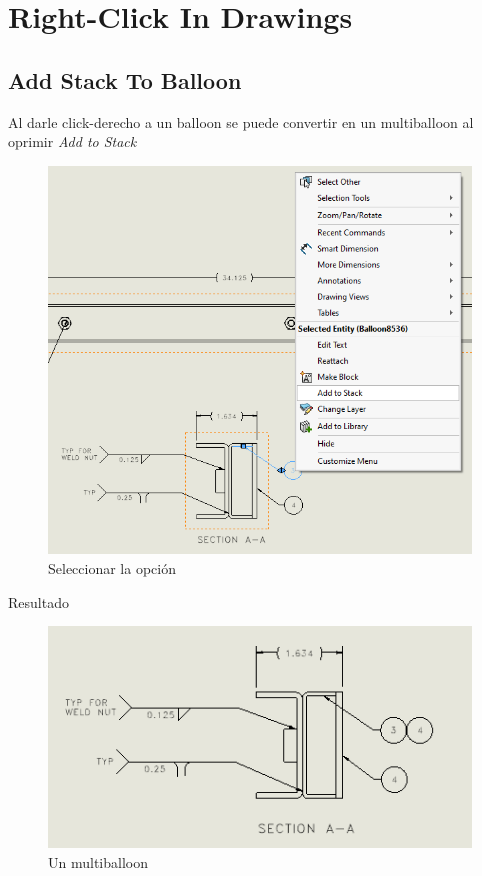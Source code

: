 \documentclass[12pt,letterpaper,final]{report}
\begin{document}
\chapter{Right-Click In Drawings}

\section{Add Stack To Balloon}

Al darle click-derecho a un balloon se puede convertir en un multiballoon al oprimir \emph{Add to Stack}

\begin{figure}[H]
	\centering
	\includegraphics[width=0.85\linewidth, height=0.5\textheight,keepaspectratio]{Imagenes/solidworks_addtostack01}
	\caption{Seleccionar la opción}
	\label{fig:solidworksaddtostack01}
\end{figure}

{\LARGE Resultado}

\begin{figure}[H]
	\centering
	\includegraphics[width=0.85\linewidth, height=0.5\textheight,keepaspectratio]{Imagenes/solidworks_addtostack02}
	\caption{Un multiballoon}
	\label{fig:solidworksaddtostack02}
\end{figure}
\end{document}
